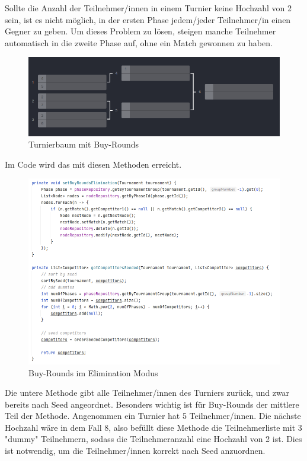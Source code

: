 Sollte die Anzahl der Teilnehmer/innen in einem Turnier keine Hochzahl von 2 sein, ist es nicht möglich, in der ersten Phase jedem/jeder Teilnehmer/in einen Gegner zu geben. 
Um dieses Problem zu lösen, steigen manche Teilnehmer automatisch in die zweite Phase auf, ohne ein Match gewonnen zu haben.

\begin{figure}[H]
    \includegraphics[scale=0.75]{pics/backend/elimination/elimination_buy_rounds.png}
    \caption{Turnierbaum mit Buy-Rounds\cite{implementation-execution-1}}
\end{figure}

Im Code wird das mit diesen Methoden erreicht.

\begin{figure}[H]
    \includegraphics[scale=0.65]{pics/backend/elimination/elimination_setBuyRounds.png}
    \caption{Buy-Rounds im Elimination Modus}
\end{figure}

Die untere Methode gibt alle Teilnehmer/innen des Turniers zurück, und zwar bereits nach Seed angeordnet. Besonders wichtig ist für Buy-Rounds der mittlere Teil der Methode. Angenommen ein Turnier hat 5 Teilnehmer/innen. 
Die nächste Hochzahl wäre in dem Fall 8, also befüllt diese Methode die Teilnehmerliste mit 3 "dummy" Teilnehmern, sodass die Teilnehmeranzahl eine Hochzahl von 2 ist. Dies ist notwendig, um die Teilnehmer/innen korrekt 
nach Seed anzuordnen. 

